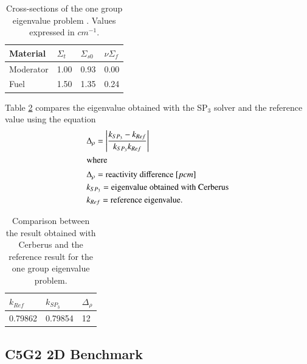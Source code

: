 \documentclass{anstrans}
\begin{document}
\begin{table}[h]
	\centering
	\caption{Cross-sections of the one group eigenvalue problem \cite{brantley_simplifiedP3_2000}. Values expressed in $cm^{-1}$.}
	\label{tab:cross-sections}
	\begin{tabular}{llll}
	\toprule
	Material	& $\Sigma_t$ & $\Sigma_{s0}$ & $\nu\Sigma_f$ \\
	\midrule
	Moderator	& 1.00		& 0.93			& 0.00			\\
	Fuel		& 1.50		& 1.35			& 0.24			\\
	\bottomrule
	\end{tabular}
\end{table}

Table \ref{tab:keff-1st} compares the eigenvalue obtained with the SP$_3$ solver and the reference value \cite{brantley_simplifiedP3_2000} using the equation
\begin{align}
  & \Delta_\rho = \left| \frac{k_{SP_3}-k_{Ref}}{k_{SP_3} k_{Ref}} \right| \label{eq:delta-rho} \\
  \intertext{where}
  & \Delta_\rho = \mbox{reactivity difference } [pcm] \notag \\
  & k_{SP_3} = \mbox{eigenvalue obtained with Cerberus} \notag \\
  & k_{Ref} = \mbox{reference eigenvalue.} \notag
\end{align}

\begin{table}[htbp!]
	\centering
	\caption{Comparison between the result obtained with Cerberus and the reference result for the one group eigenvalue problem.}
	\label{tab:keff-1st}
	\begin{tabular}{lll}
	\toprule
		$k_{Ref}$	& $k_{SP_3}$ 	& $\Delta_{\rho}$	\\
	\midrule
	 	0.79862		& 0.79854		& 12				\\
	\bottomrule
	\end{tabular}
\end{table}


\subsection{C5G2 2D Benchmark}
\end{document}
